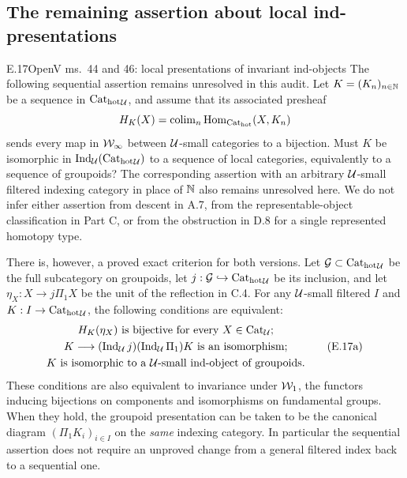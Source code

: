 \subsection{The remaining assertion about local ind-presentations}

\begin{claim}{E.17}{Open}{V ms.~44 and 46: local presentations of invariant ind-objects}
The following sequential assertion remains unresolved in this audit.
Let $K=(K_n)_{n\in\mathbb N}$ be a sequence in ${\mathrm{Cat}_{\mathrm{hot}}}_\mathcal U$, and assume
that its associated presheaf
\[
 H_K(X)=\operatorname{colim}_n\operatorname{Hom}_{{\mathrm{Cat}_{\mathrm{hot}}}}(X,K_n)
\]
sends every map in $\mathcal W_\infty$ between $\mathcal U$-small categories to a
bijection. Must $K$ be isomorphic in $\operatorname{Ind}_\mathcal U({\mathrm{Cat}_{\mathrm{hot}}}_\mathcal U)$ to a
sequence of local categories, equivalently to a sequence of groupoids?
The corresponding assertion with an arbitrary $\mathcal U$-small filtered
indexing category in place of $\mathbb N$ also remains unresolved here.
We do not infer either assertion from descent in A.7, from the
representable-object classification in Part C, or from the obstruction
in D.8 for a single represented homotopy type.
\end{claim}

There is, however, a proved exact criterion for both versions. Let
$\mathcal G\subset{\mathrm{Cat}_{\mathrm{hot}}}_\mathcal U$ be the full subcategory on groupoids,
let $j:\mathcal G\hookrightarrow{\mathrm{Cat}_{\mathrm{hot}}}_\mathcal U$ be its inclusion, and
let $\eta_X:X\to j\Pi_1X$ be the unit of the reflection in C.4.
For any $\mathcal U$-small filtered $I$ and $K:I\to{\mathrm{Cat}_{\mathrm{hot}}}_\mathcal U$, the
following conditions are equivalent:
\[
\begin{gathered}
 H_K(\eta_X)\text{ is bijective for every }X\in\mathrm{Cat}_\mathcal U;\\
 K\longrightarrow(\operatorname{Ind}_\mathcal U j)(\operatorname{Ind}_\mathcal U\Pi_1)K
       \text{ is an isomorphism};\\
 K\text{ is isomorphic to a }\mathcal U\text{-small ind-object of groupoids}.
\end{gathered}
\tag{E.17a}
\]
These conditions are also equivalent to invariance under $\mathcal W_1$,
the functors inducing bijections on components and isomorphisms on
fundamental groups. When they hold, the groupoid presentation can
be taken to be the canonical diagram $(\Pi_1K_i)_{i\in I}$ on the
\emph{same} indexing category. In particular the sequential assertion
does not require an unproved change from a general filtered index
back to a sequential one.


